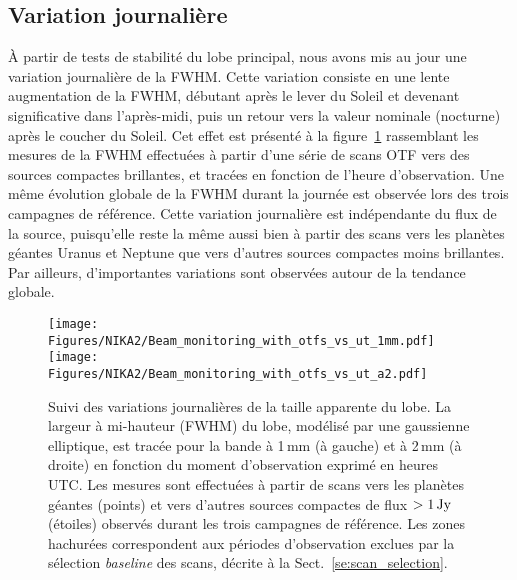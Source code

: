 \subsection{Variation journalière}
\label{se:fwhm_variations}

\`A partir de tests de stabilité du lobe principal, nous
avons mis au jour une variation journalière de la FWHM. Cette
variation consiste en une lente augmentation de la FWHM, débutant
après le lever du Soleil et devenant significative dans l'après-midi,
puis un retour vers la valeur nominale (nocturne) après le coucher du
Soleil. Cet effet est présenté à la
figure~\ref{fig:beam_monitoring_otf} rassemblant les mesures de la
FWHM effectuées à partir d'une série de scans OTF vers des sources
compactes brillantes, et tracées en fonction de l'heure
d'observation. Une même évolution globale de la FWHM durant la journée
est observée lors des trois campagnes de référence. Cette variation
journalière est indépendante du flux de la source, puisqu'elle reste
la même aussi bien à partir des scans vers les planètes géantes Uranus
et Neptune que vers d'autres sources compactes moins brillantes. Par
ailleurs, d'importantes variations sont observées autour de la
tendance globale.
%
\begin{figure}[ht!]
  \begin{center}
    \texttt{[image: Figures/NIKA2/Beam\_monitoring\_with\_otfs\_vs\_ut\_1mm.pdf]}
    \texttt{[image: Figures/NIKA2/Beam\_monitoring\_with\_otfs\_vs\_ut\_a2.pdf]}
    \caption[Beam size monitoring using OTF scans]{Suivi des
      variations journalières de la taille apparente du lobe. La
      largeur à mi-hauteur (FWHM) du lobe, modélisé par une gaussienne
      elliptique, est tracée pour la bande à 1\,mm (à gauche) et à
      2\,mm (à droite) en fonction du moment d'observation exprimé en
      heures UTC. Les mesures sont effectuées à partir de scans vers
      les planètes géantes (points) et vers d'autres sources
      compactes de flux $>1\,\rm{Jy}$ (étoiles) observés durant les
      trois campagnes de référence. Les zones hachurées correspondent
      aux périodes d'observation exclues par la sélection
      \emph{baseline} des scans, décrite à la Sect.~\ref{se:scan_selection}.} 
\label{fig:beam_monitoring_otf}
  \end{center}
\end{figure}

